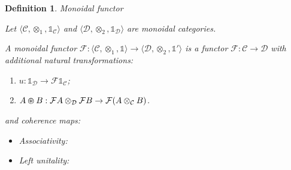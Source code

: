 \documentclass[a4paper]{article}
\newtheorem{defin}{Definition}
\begin{document}
\begin{defin} Monoidal functor

  Let $\langle \mathcal{C}, \otimes_1, \mathds{1}_{\mathcal{C}} \rangle$ and $\langle \mathcal{D}, \otimes_2, \mathds{1}_{\mathcal{D}} \rangle$ are monoidal categories.

  A monoidal functor $\mathcal{F} : \langle \mathcal{C}, \otimes_1, \mathds{1} \rangle \to \langle \mathcal{D}, \otimes_2, \mathds{1}' \rangle$ is a functor
  $\mathcal{F} : \mathcal{C} \to \mathcal{D}$ with additional natural transformations:

  \begin{enumerate}
  \item $u : \mathds{1}_{\mathcal{D}} \to \mathcal{F}\mathds{1}_{\mathcal{C}}$;
  \item $A \varoast B : \mathcal{F}A \otimes_{\mathcal{D}} \mathcal{F}B \to \mathcal{F}(A \otimes_{\mathcal{C}} B)$.
\end{enumerate}

  and coherence maps:

  \begin{itemize}
    \item Associativity:


    \item Left unitality:



\end{itemize}
\end{defin}
\end{document}
